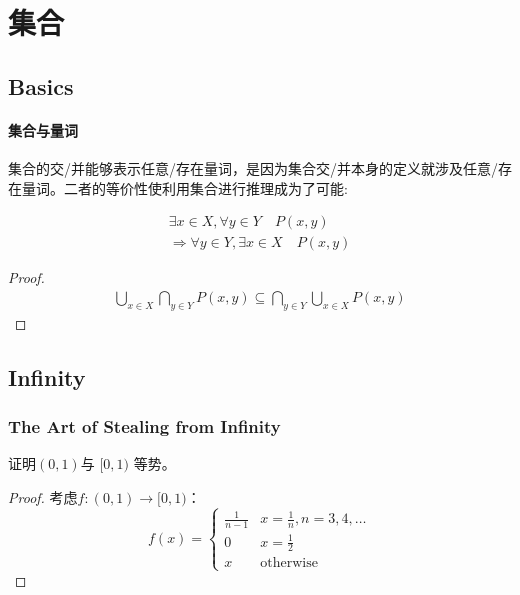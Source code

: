 \chapter{集合}
\section{Basics}

\subsubsection{集合与量词}

集合的交/并能够表示任意/存在量词，是因为集合交/并本身的定义就涉及任意/存在量词。二者的等价性使利用集合进行推理成为了可能:

\begin{theorem}{}{}
    \begin{align*}
        \exists x \in X, \forall y \in Y \quad P(x,y) \\
        \Rightarrow \forall y \in Y, \exists x \in X \quad P(x,y)
    \end{align*}
\end{theorem}

\begin{proof}
    \begin{align*}
        \bigcup_{x \in X} \bigcap_{y \in Y} P(x,y) \subseteq
        \bigcap_{y \in Y} \bigcup_{x \in X} P(x,y)
    \end{align*}
\end{proof}

\section{Infinity}
\subsection{The Art of Stealing from Infinity}

\begin{problem}
    证明\((0,1)\)与 \([0,1)\) 等势。
\end{problem}

\begin{proof}
    考虑\(f:(0,1) \to [0,1)\)：\[
        f(x) =
        \begin{cases}
            \frac{1}{n-1} & x =\frac{1}{n}, n=3,4,\dots  \\
            0 & x=\frac{1}{2} \\
            x & \text{otherwise}
        \end{cases}
    \]
\end{proof}

